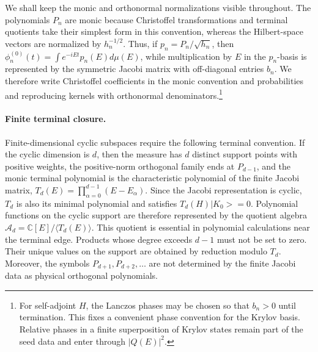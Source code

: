 \documentclass[a4paper,11pt]{article}
\def\ket#1{|#1>}%
\def\dd{d}%
\def\ii{i}%
\def\ee{e}%
\theoremstyle{definition}
\theoremstyle{remark}
\newcommand{\ket}[1]{|#1\rangle}
\newcommand{\dd}{\mathrm d}
\newcommand{\ii}{\mathrm i}
\newcommand{\ee}{\mathrm e}
\newcommand{\CC}{\mathbb C}
\newcommand{\cA}{\mathcal A}
\begin{document}
We shall keep the monic and orthonormal normalizations visible throughout. The polynomials $P_n$ are monic because Christoffel transformations and terminal quotients take their simplest form in this convention, whereas the Hilbert-space vectors are normalized by $h_n^{-1/2}$. Thus, if $p_n=P_n/\sqrt{h_n}$, then 
$\phi_n^{(0)}(t)=\int\ee^{-\ii Et}p_n(E)\dd\mu(E)$, while multiplication by $E$ in the $p_n$-basis is represented by the symmetric Jacobi matrix with off-diagonal entries $b_n$. We therefore write Christoffel coefficients in the monic convention and probabilities and reproducing kernels with orthonormal denominators.\footnote{For self-adjoint $H$, the Lanczos phases may be chosen so that $b_n>0$ until termination. This fixes a convenient phase convention for the Krylov basis. Relative phases in a finite superposition of Krylov states remain part of the seed data and enter through $|Q(E)|^2$.}

\paragraph{Finite terminal closure.}
Finite-dimensional cyclic subspaces require the following terminal convention. If the cyclic dimension is $d$, then the measure has $d$ distinct support points with positive weights, the positive-norm orthogonal family ends at $P_{d-1}$, and the monic terminal polynomial is the characteristic polynomial of the finite Jacobi matrix,
$
   T_d(E)=\prod_{\alpha=0}^{d-1}(E-E_\alpha).
$
Since the Jacobi representation is cyclic, $T_d$ is also its minimal polynomial and satisfies $T_d(H)\ket{K_0}=0$. Polynomial functions on the cyclic support are therefore represented by the quotient algebra
$
   \cA_d=\CC[E]/\langle T_d(E)\rangle.
$
This quotient is essential in polynomial calculations near the terminal edge. Products whose degree exceeds $d-1$ must not be set to zero. Their unique values on the support are obtained by reduction modulo $T_d$. Moreover, the symbols $P_{d+1},P_{d+2},\ldots$ are not determined by the finite Jacobi data as physical orthogonal polynomials. 
\end{document}
